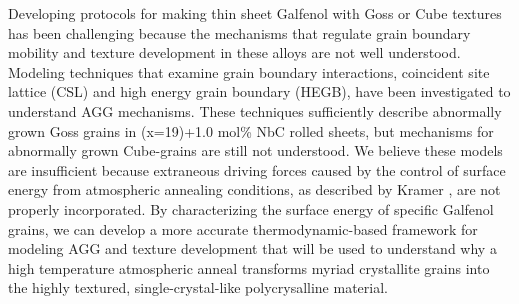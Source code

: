  Developing protocols for making thin sheet Galfenol with Goss or Cube textures has been challenging because the mechanisms that regulate grain boundary mobility and texture development in these alloys are not well understood. Modeling techniques that examine grain boundary interactions, coincident site lattice (CSL) and high energy grain boundary (HEGB), have been investigated to understand AGG mechanisms. These techniques sufficiently describe abnormally grown Goss grains in \fegacomp(x=19)+1.0 mol\% NbC rolled sheets, but mechanisms for abnormally grown Cube-grains are still not understood.\cite{Chun2010} We believe these models are insufficient because extraneous driving forces caused by the control of surface energy from atmospheric annealing conditions, as described by Kramer \etal, are not properly incorporated. By characterizing the surface energy of specific Galfenol grains, we can develop a more accurate thermodynamic-based framework for modeling AGG and texture development that will be used to understand why a high temperature atmospheric anneal transforms myriad crystallite grains into the highly textured, single-crystal-like polycrysalline material. 






 




